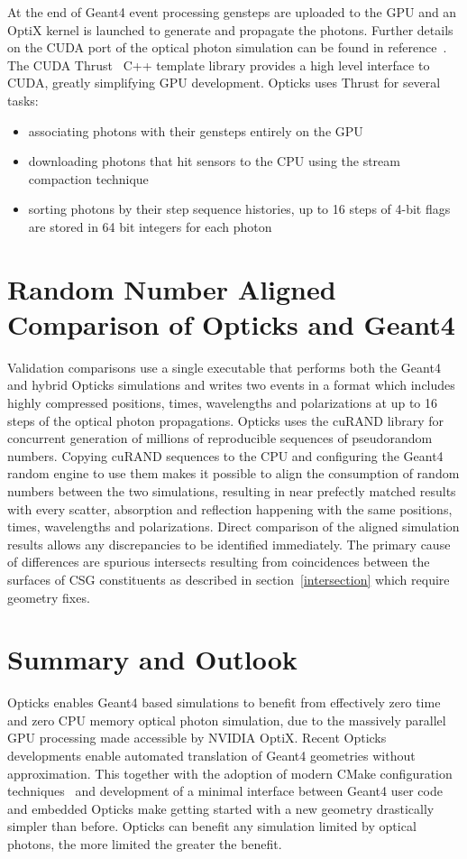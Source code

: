 \documentclass{webofc}
\begin{document}
At the end of Geant4 event processing gensteps are uploaded to the GPU and an OptiX 
kernel is launched to generate and propagate the photons.
Further details on the CUDA port of the optical photon simulation can be found in reference~\cite{chep2016}.
The CUDA Thrust~\cite{thrust} C++ template library provides a high level interface to CUDA, 
greatly simplifying GPU development. Opticks uses Thrust for several tasks:
%
\begin{itemize}
\item associating photons with their gensteps entirely on the GPU
\item downloading photons that hit sensors to the CPU using the stream compaction technique
\item sorting photons by their step sequence histories, up to 16 steps of 4-bit flags are stored in 64 bit integers for each photon
\end{itemize} 
%
\section{Random Number Aligned Comparison of Opticks and Geant4}
\label{validation}
%
Validation comparisons use a single executable that performs both
the Geant4 and hybrid Opticks simulations and writes two events in a format
which includes highly compressed positions, times, wavelengths and polarizations at up to 16 steps of the optical photon propagations.
Opticks uses the cuRAND\cite{curandURL} library for concurrent generation of millions of reproducible sequences of pseudorandom numbers.  
Copying cuRAND sequences to the CPU and configuring the Geant4 random engine to use them makes it possible to align the 
consumption of random numbers between the two simulations, resulting in near prefectly matched results with every scatter, 
absorption and reflection happening with the same positions, times, wavelengths and polarizations.
Direct comparison of the aligned simulation results allows any discrepancies to be identified immediately.
The primary cause of differences are spurious intersects resulting from coincidences between the surfaces
of CSG constituents as described in section~\ref{intersection} which require geometry fixes.
%
\section{Summary and Outlook}
%
Opticks enables Geant4 based simulations to benefit from effectively zero time 
and zero CPU memory optical photon simulation, due to the massively parallel GPU 
processing made accessible by NVIDIA OptiX.
Recent Opticks developments enable automated translation of Geant4 geometries without approximation. 
This together with the adoption of modern CMake configuration techniques~\cite{BCM} and development of a 
minimal interface between Geant4 user code and embedded Opticks make getting started with a new geometry
drastically simpler than before.
Opticks can benefit any simulation limited by optical photons, the more limited the greater the 
benefit.
%
%
\end{document}

